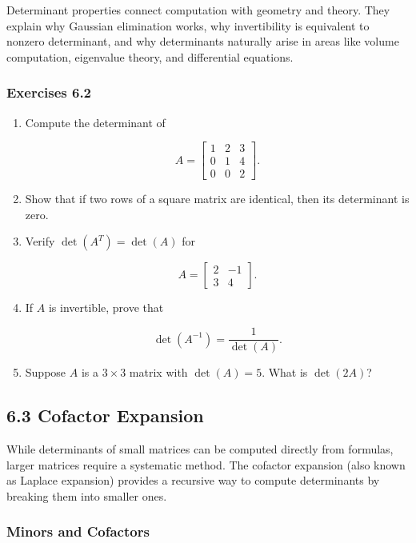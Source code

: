 \documentclass[
  12pt,
  a4paper,
]{article}
\begin{document}
Determinant properties connect computation with geometry and theory.
They explain why Gaussian elimination works, why invertibility is
equivalent to nonzero determinant, and why determinants naturally arise
in areas like volume computation, eigenvalue theory, and differential
equations.

\subsubsection{Exercises 6.2}\label{exercises-62}

\begin{enumerate}
\def\labelenumi{\arabic{enumi}.}
\item
  Compute the determinant of

  \[A = \begin{bmatrix} 1 & 2 & 3 \\ 0 & 1 & 4 \\ 0 & 0 & 2 \end{bmatrix}.\]
\item
  Show that if two rows of a square matrix are identical, then its
  determinant is zero.
\item
  Verify \(\det(A^T) = \det(A)\) for

  \[A = \begin{bmatrix} 2 & -1 \\ 3 & 4 \end{bmatrix}.\]
\item
  If \(A\) is invertible, prove that

  \[\det(A^{-1}) = \frac{1}{\det(A)}.\]
\item
  Suppose \(A\) is a \(3\times 3\) matrix with \(\det(A) = 5\). What is
  \(\det(2A)\)?
\end{enumerate}

\subsection{6.3 Cofactor Expansion}\label{63-cofactor-expansion}

While determinants of small matrices can be computed directly from
formulas, larger matrices require a systematic method. The cofactor
expansion (also known as Laplace expansion) provides a recursive way to
compute determinants by breaking them into smaller ones.

\subsubsection{Minors and Cofactors}\label{minors-and-cofactors}
\end{document}
